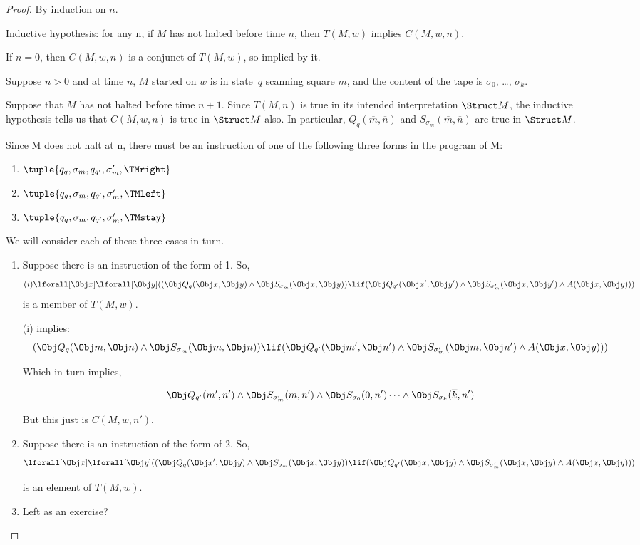\documentclass[../../include/open-logic-section]{subfiles}
\begin{document}
\begin{proof}
By induction on $n$.

Inductive hypothesis: for any n, if $M$ has not halted before time $n$, then $T(M,w)$ implies $C(M, w, n)$.

If $n = 0$, then $C(M, w, n)$ is a conjunct of $T(M, w)$, so implied by it.

Suppose $n > 0$ and at time $n$, $M$ started on $w$ is in state~$q$
scanning square $m$, and the content of the tape is $\sigma_0$, \dots,
$\sigma_k$.

Suppose that $M$ has not halted before time $n+1$. Since $T(M,n)$ is true in its intended interpretation $\Struct M$, the inductive hypothesis tells us that $C(M, w, n)$ is true in $\Struct M$ also. In particular, $Q_q(\overline m, \overline n)$ and $S_{\sigma_m}(\overline m, \overline n)$ are true in $\Struct M$.

Since M does not halt at n, there must be an instruction of one of the following three forms in the program of M:
\begin{enumerate}
\item $\tuple{q_q, \sigma_m , q_{q'}, \sigma'_{m}, \TMright}$

\item $\tuple{q_q, \sigma_m , q_{q'}, \sigma'_{m}, \TMleft}$

\item $\tuple{q_q, \sigma_m , q_{q'}, \sigma'_{m}, \TMstay}$
\end{enumerate}

We will consider each of these three cases in turn.

\begin{enumerate}
\item Suppose there is an instruction of the form of 1.
So, 
 \[
(i) \lforall[\Obj x] \lforall[\Obj y](
   (\Obj Q_{q}(\Obj x, \Obj y) \land \Obj S_{\sigma_m}(\Obj x, \Obj y)) \lif
   (\Obj Q_{q'}(\Obj x', \Obj y') \land \Obj S_{\sigma'_{m}}(\Obj x, \Obj y') \land
A(\Obj x, \Obj y)))
\]
is a member of $T(M,w)$.

(i) implies:
 \[
   (\Obj Q_{q}(\Obj m, \Obj n) \land \Obj S_{\sigma_m}(\Obj m, \Obj n)) \lif
   (\Obj Q_{q'}(\Obj m', \Obj n') \land \Obj S_{\sigma'_{m}}(\Obj m, \Obj n') \land
A(\Obj x, \Obj y)))
\]

Which in turn implies,

\[
\Obj Q_{q'}(m', n') \land \Obj S_{\sigma'_m}(m, n') \land \Obj S_{\sigma_0}(0, n')\dots \land \Obj S_{\sigma_k}(\overline k,
n')
\]

But this just is $C(M, w, n')$.


\item Suppose there is an instruction of the form of 2.
So, 
\[
\lforall[\Obj x] \lforall[\Obj y](
   (\Obj Q_{q}(\Obj x', \Obj y) \land \Obj S_{\sigma_m}(\Obj x, \Obj y)) \lif
   (\Obj Q_{q'}(\Obj x, \Obj y) \land \Obj S_{\sigma'_m}(\Obj x, \Obj y) \land
A(\Obj x, \Obj y)))
\]

is an element of $T(M,w)$.

\item Left as an exercise?

\end{enumerate}
\end{proof}
\end{document}
